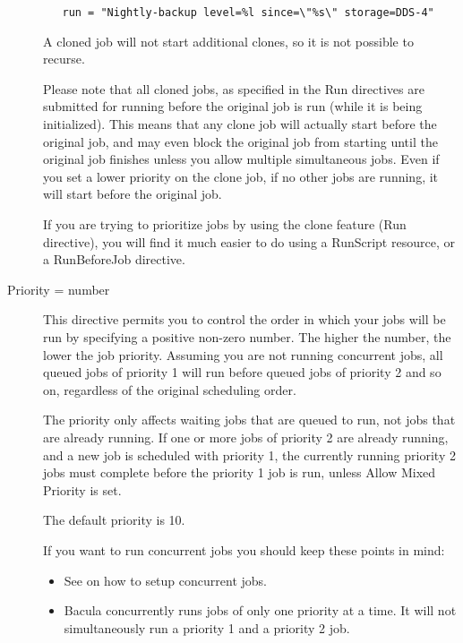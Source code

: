 \begin{description}
\begin{verbatim}
   run = "Nightly-backup level=%l since=\"%s\" storage=DDS-4"
\end{verbatim}

   A cloned job will not start additional clones, so it is not
   possible to recurse.

   Please note that all cloned jobs, as specified in the Run directives are
   submitted for running before the original job is run (while it is being
   initialized). This means that any clone job will actually start before
   the original job, and may even block the original job from starting
   until the original job finishes unless you allow multiple simultaneous
   jobs.  Even if you set a lower priority on the clone job, if no other
   jobs are running, it will start before the original job.

   If you are trying to prioritize jobs by using the clone feature (Run
   directive), you will find it much easier to do using a RunScript
   resource, or a RunBeforeJob directive.

\label{Priority}
\item [Priority = \lt{}number\gt{}]
   This directive permits you to control the order in which your jobs will
   be run by specifying a positive non-zero number. The higher the number,
   the lower the job priority. Assuming you are not running concurrent jobs,
   all queued jobs of priority 1 will run before queued jobs of priority 2
   and so on, regardless of the original scheduling order.

   The priority only affects waiting jobs that are queued to run, not jobs
   that are already running.  If one or more jobs of priority 2 are already
   running, and a new job is scheduled with priority 1, the currently
   running priority 2 jobs must complete before the priority 1 job is
   run, unless Allow Mixed Priority is set.

   The default priority is 10.  

   If you want to run concurrent jobs you should
   keep these points in mind:

\begin{itemize}
\item See  on how to setup
   concurrent jobs.

\item Bacula concurrently runs jobs of only one priority at a time.  It
   will not simultaneously run a priority 1 and a priority 2 job.


\end{itemize}
\end{description}
